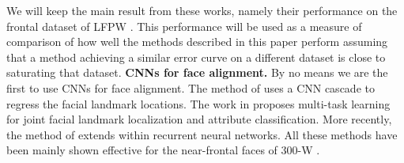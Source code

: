 	We will keep the main result from these works, namely their performance on the frontal dataset of LFPW \cite{belhumeur2011localizing}. This performance will be used as a measure of comparison of how well the methods described in this paper perform assuming that a method achieving a similar error curve on a different dataset is close to saturating that dataset.  
	\textbf{CNNs for face alignment.} By no means we are the first to use CNNs for face alignment. The method of \cite{sun2013deep} uses a CNN cascade to regress the facial landmark locations. The work in \cite{zhang2014facial} proposes multi-task learning for joint facial landmark localization and attribute classification. More recently, the method of \cite{trigeorgismnemonic} extends \cite{xiong2013supervised} within recurrent neural networks. All these methods have been mainly shown effective for the near-frontal faces of 300-W \cite{sagonas2013semi}.

